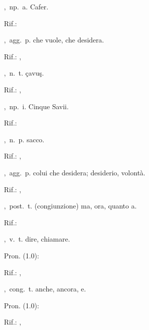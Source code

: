 ,\ np.\ a.
Cafer.
\begin{subvocedue}
\item[Rif.:] 
\end{subvocedue}
,\ agg.\ p.
che vuole, che desidera.
\begin{subvocedue}
\item[Rif.:] , 
\end{subvocedue}
,\ n.\ t.
çavuş.
\begin{subvocedue}
\item[Rif.:] , 
\end{subvocedue}
,\ np.\ i.
Cinque Savii.
\begin{subvocedue}
\item[Rif.:] 
\end{subvocedue}
,\ n.\ p.
sacco.
\begin{subvocedue}
\item[Rif.:] , 
\end{subvocedue}
,\ agg.\ p.
colui che desidera; desiderio, volontà.
\begin{subvocedue}
\item[Rif.:] , 
\end{subvocedue}
,\ post.\ t.
(congiunzione) ma, ora, quanto a.
\begin{subvocedue}
\item[Rif.:] 
\end{subvocedue}
,\ v.\ t.
dire, chiamare.
\begin{subvocedue}
\item[Pron. (1.0):] 
\item[Rif.:] , 
\end{subvocedue}
,\ cong.\ t.
anche, ancora, e.
\begin{subvocedue}
\item[Pron. (1.0):] 
\item[Rif.:] , 
\end{subvocedue}
